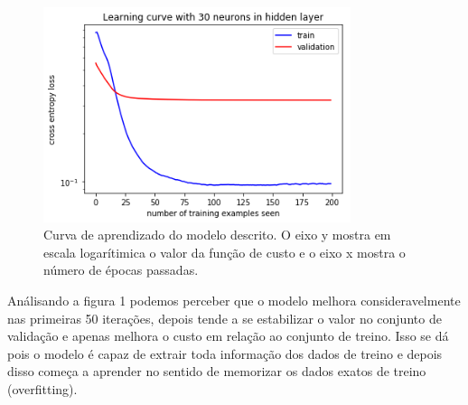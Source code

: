 \documentclass[a4paper, 12pt]{article}
\begin{document}
\begin{figure}[H]
    \centering
  \includegraphics[width=9cm]{images/online_curve_h_30.png}
    \caption{Curva de aprendizado do modelo descrito. O eixo y mostra em escala logarítimica o valor da função de custo e o eixo x mostra o número de épocas passadas.}
\end{figure}



Análisando a figura 1 podemos perceber que o modelo melhora consideravelmente nas primeiras 50 iterações, depois tende a se estabilizar o valor no conjunto de validação e apenas melhora o custo em relação ao conjunto de treino. Isso se dá pois o modelo é capaz de extrair toda informação dos dados de treino e depois disso começa a aprender no sentido de memorizar os dados exatos de treino (overfitting).
\end{document}

